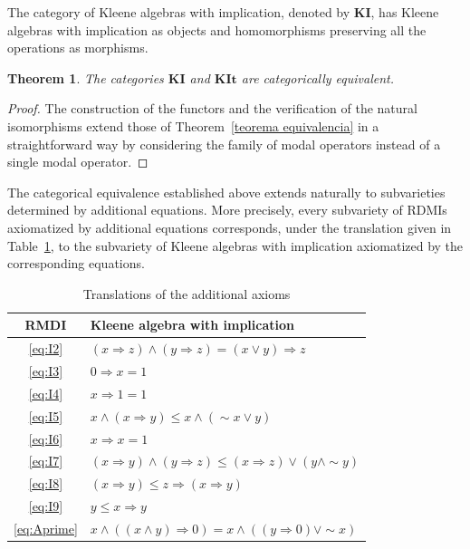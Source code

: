\documentclass[10pt,a4paper]{amsart}
\newtheorem{theorem}{Theorem}[section]
\begin{document}
The category of Kleene algebras with implication, denoted by $\mathbf{KI}$, has Kleene algebras with implication as objects and homomorphisms preserving all the operations as morphisms.

\begin{theorem}
The categories $\mathbf{KI}$ and $\mathbf{KIt}$ are categorically equivalent.
\end{theorem}
\begin{proof}
    The construction of the functors and the verification of the natural isomorphisms extend those of Theorem~\ref{teorema equivalencia} in a straightforward way by considering the family of modal operators instead of a single modal operator.
\end{proof}

The categorical equivalence established above extends naturally to subvarieties determined by additional equations. More precisely, every subvariety of RDMIs axiomatized by additional equations corresponds, under the translation given in Table~\ref{tab:rdmi-kleene}, to the subvariety of Kleene algebras with implication axiomatized by the corresponding equations.

\begin{table}[ht]
\centering
\small
\renewcommand{\arraystretch}{1.5}
\begin{tabular}{|c|l|}
\hline
RMDI& Kleene algebra with implication \\
\hline
    \eqref{eq:I2} &
$(x\Rightarrow z)\wedge(y\Rightarrow z)=(x\vee y)\Rightarrow z$
\\
\hline
\eqref{eq:I3} &
$0\Rightarrow x=1$
\\
\hline
\eqref{eq:I4} &
$x\Rightarrow1=1$
\\
\hline
\eqref{eq:I5} &
$x\wedge(x\Rightarrow y)\le x\wedge(\sim x\vee y)$
\\
\hline
\eqref{eq:I6} &
$x\Rightarrow x=1$
\\
\hline
\eqref{eq:I7} &
$(x\Rightarrow y)\wedge(y\Rightarrow z)
\le
(x\Rightarrow z)\vee(y\wedge\sim y)$
\\
\hline
\eqref{eq:I8} &
$(x\Rightarrow y)\le z\Rightarrow(x\Rightarrow y)$
\\
\hline
\eqref{eq:I9} &
$ y\le x\Rightarrow y$
\\
\hline
\eqref{eq:Aprime} &
$x\wedge((x\wedge y)\Rightarrow 0)= x\wedge(( y\Rightarrow 0)\vee \sim x)$
\\
\hline
\end{tabular}
\caption{Translations of the additional axioms}
\label{tab:rdmi-kleene}
\end{table}
\end{document}
